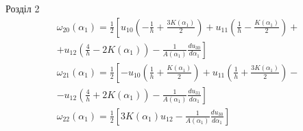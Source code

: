 \documentclass[8pt]{beamer}
\numberwithin{figure}{section}
\numberwithin{equation}{section}
\begin{document}
\begin{frame}{Розділ 2}
\begin{equation}\label{eq:sqt_strain_ang}
\begin{aligned}
\omega_{20}\left(\alpha_1\right)=\frac12 
\left[
u_{10}
\left( -\frac{1}{h}+\frac{3K\left( \alpha_1 \right)}{2} \right)
+u_{11}\left( \frac{1}{h}-\frac{K\left( \alpha_1 \right)}{2} \right)+\right.\\
\left.
+u_{12}\left( \frac{4}{h}-2K\left( \alpha_1 \right) \right)
 - \frac{1}{A\left(\alpha_1\right)}\frac{du_{30}}{d\alpha_1}
\right]\\
\omega_{21}\left(\alpha_1\right)=\frac12 
\left[
-u_{10}
\left( \frac{1}{h}+\frac{K\left( \alpha_1 \right)}{2} \right)
+u_{11}\left( \frac{1}{h}+\frac{3K\left( \alpha_1 \right)}{2} \right)-\right.\\
\left.
-u_{12}\left( \frac{4}{h}+2K\left( \alpha_1 \right) \right)
 - \frac{1}{A\left(\alpha_1\right)}\frac{du_{31}}{d\alpha_1}
\right]\\
\omega_{22}\left(\alpha_1\right)=\frac12 
\left[3K\left( \alpha_1 \right)u_{12}
 - \frac{1}{A\left(\alpha_1\right)}\frac{du_{30}}{d\alpha_1}
\right]
\end{aligned}
\end{equation}

\end{frame}
\end{document}
